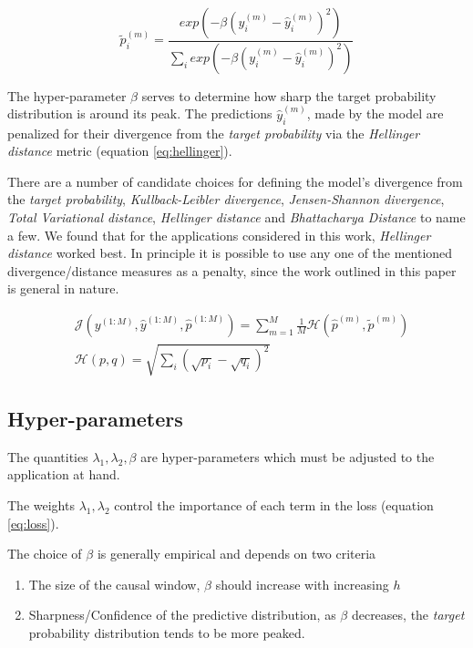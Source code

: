\documentclass[twoside]{article}
\begin{document}
\begin{equation}\label{eq:targetprob}
\widetilde{p}_{i}^{(m)} = \frac{exp \left(- \beta (y_{i}^{(m)} - \hat{y}_{i}^{(m)})^{2} \right)}{\sum_{i}{exp \left(- \beta (y_{i}^{(m)} - \hat{y}_{i}^{(m)})^{2} \right)}} 
\end{equation}

The hyper-parameter $\beta$ serves to determine how sharp the target probability distribution is around its peak. The predictions $\hat{y}^{(m)}_{i}$, made by the model are penalized for their divergence from the \emph{target probability} via the \emph{Hellinger distance} metric (equation \ref{eq:hellinger}).


There are a number of candidate choices for defining the model's divergence from the \emph{target probability}, \emph{Kullback-Leibler divergence}, \emph{Jensen-Shannon divergence}, \emph{Total Variational distance}, \emph{Hellinger distance} and \emph{Bhattacharya Distance} to name a few. We found that for the applications considered in this work, \emph{Hellinger distance} worked best. In principle it is possible to use any one of the mentioned divergence/distance measures as a penalty, since the work outlined in this paper is general in nature.

\begin{align}\label{eq:prior}
& \mathcal{J}(y^{(1:M)}, \hat{y}^{(1:M)}, \hat{p}^{(1:M)}) = \sum_{m = 1}^{M}{\frac{1}{M} \mathcal{H}(\hat{p}^{(m)}, \widetilde{p}^{(m)})} \\
& \mathcal{H}(p, q) = \sqrt{\sum_{i}{(\sqrt{p_i} -  \sqrt{q_i})^2}} \label{eq:hellinger}
\end{align}


\subsection{Hyper-parameters}

The quantities $\lambda_1, \lambda_2, \beta$ are hyper-parameters which must be adjusted to the application at hand.

The weights $\lambda_1, \lambda_2$ control the importance of each term in the loss (equation \ref{eq:loss}).

The choice of $\beta$ is generally empirical and depends on two criteria 
\begin{enumerate} \item The size of the causal window, $\beta$ should increase with increasing $h$ 
\item Sharpness/Confidence of the predictive distribution, as $\beta$ decreases, the \emph{target} probability distribution tends to be more peaked.  \end{enumerate}
\end{document}
